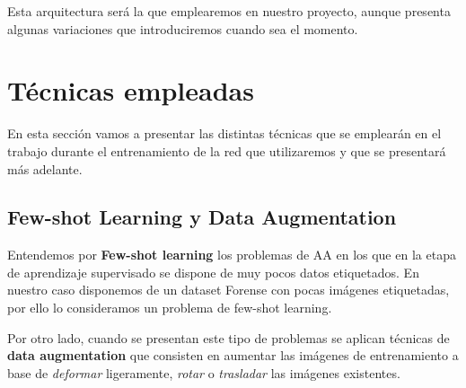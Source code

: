             \noindent Esta arquitectura será la que emplearemos en nuestro proyecto, aunque presenta algunas variaciones que introduciremos cuando sea el momento.

\section{Técnicas empleadas}
    \noindent En esta sección vamos a presentar las distintas técnicas que se emplearán en el trabajo durante el entrenamiento de la red que utilizaremos y que se presentará más adelante. 

    \subsection{Few-shot Learning y Data Augmentation} \label{sub:data_augmentation}
        \noindent Entendemos por \textbf{Few-shot learning} los problemas de AA en los que en la etapa de aprendizaje supervisado se dispone de muy pocos datos etiquetados. En nuestro caso disponemos de un dataset Forense con pocas imágenes etiquetadas, por ello lo consideramos un problema de few-shot learning.

        \medskip

        \noindent Por otro lado, cuando se presentan este tipo de problemas se aplican técnicas de \textbf{data augmentation} que consisten en aumentar las imágenes de entrenamiento a base de \textit{deformar} ligeramente, \textit{rotar} o \textit{trasladar} las imágenes existentes.
        
\endinput


